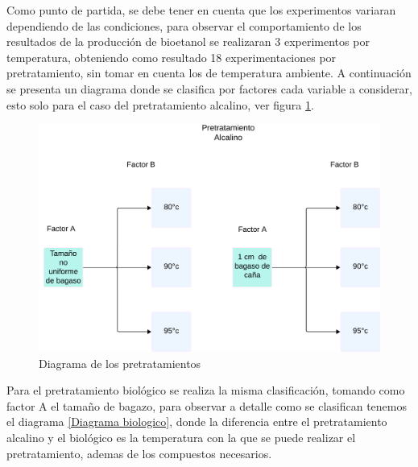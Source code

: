 \documentclass[12pt]{article}
\begin{document}
		Como punto de partida, se debe tener en cuenta que los experimentos variaran dependiendo de las condiciones, para observar el comportamiento de los resultados de la producción de bioetanol se realizaran 3 experimentos por temperatura, obteniendo como resultado 18 experimentaciones por pretratamiento, sin tomar en cuenta los de temperatura ambiente.
		A continuación se presenta un diagrama donde se clasifica por factores cada variable a considerar, esto solo para el caso del pretratamiento alcalino, ver figura  \ref{Diagrama1}.
		
		
		
		\begin{figure} [h!]
			\centering
			\includegraphics[width=0.7\linewidth]{imagenes/diagrama}
			\caption{Diagrama de los pretratamientos}
			\label{Diagrama1}
		\end{figure}
		
		Para el pretratamiento biológico se realiza la misma clasificación, tomando como factor A el tamaño de bagazo, para observar a detalle como se clasifican tenemos el diagrama \ref{Diagrama biologico}, donde la diferencia entre el pretratamiento alcalino y el biológico es la temperatura con la que se puede realizar el pretratamiento, ademas de los compuestos necesarios.
		
\end{document}
